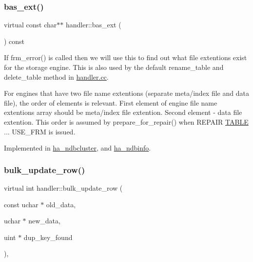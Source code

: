 \subsubsection{\texorpdfstring{bas\+\_\+ext()}{bas\_ext()}}
{\footnotesize\ttfamily virtual const char$\ast$$\ast$ handler\+::bas\+\_\+ext (\begin{DoxyParamCaption}{ }\end{DoxyParamCaption}) const\hspace{0.3cm}{\ttfamily [pure virtual]}}

If frm\+\_\+error() is called then we will use this to find out what file extentions exist for the storage engine. This is also used by the default rename\+\_\+table and delete\+\_\+table method in \mbox{\hyperlink{handler_8cc}{handler.\+cc}}.

For engines that have two file name extentions (separate meta/index file and data file), the order of elements is relevant. First element of engine file name extentions array should be meta/index file extention. Second element -\/ data file extention. This order is assumed by prepare\+\_\+for\+\_\+repair() when R\+E\+P\+A\+IR \mbox{\hyperlink{structTABLE}{T\+A\+B\+LE}} ... U\+S\+E\+\_\+\+F\+RM is issued. 

Implemented in \mbox{\hyperlink{classha__ndbcluster_ade5341ce688c24b5885145f821cdf249}{ha\+\_\+ndbcluster}}, and \mbox{\hyperlink{classha__ndbinfo_ae7153997d64cb4e94ce23ecfb92714fb}{ha\+\_\+ndbinfo}}.

\mbox{\label{classhandler_ac8dd7e44bc71120ace1e467ccb02ad06}} 
\subsubsection{\texorpdfstring{bulk\+\_\+update\+\_\+row()}{bulk\_update\_row()}}
{\footnotesize\ttfamily virtual int handler\+::bulk\+\_\+update\+\_\+row (\begin{DoxyParamCaption}\item[{const uchar $\ast$}]{old\+\_\+data,  }\item[{uchar $\ast$}]{new\+\_\+data,  }\item[{uint $\ast$}]{dup\+\_\+key\+\_\+found }\end{DoxyParamCaption})\hspace{0.3cm}{\ttfamily [inline]}, {\ttfamily [virtual]}}

